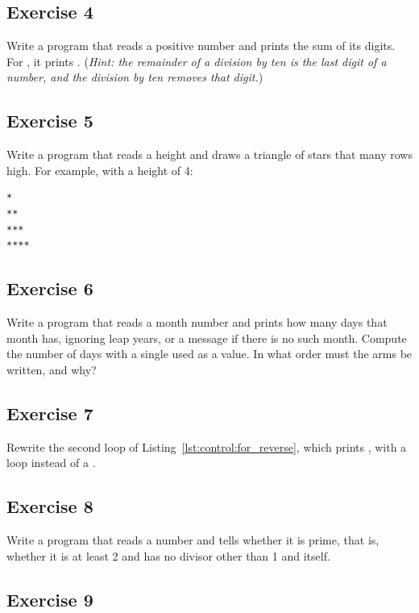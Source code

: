 \subsection*{Exercise 4}

Write a program that reads a positive number and prints the sum of its digits.
For , it prints . (\textit{Hint: the remainder of a
division by ten is the last digit of a number, and the division by ten removes
that digit.})

\subsection*{Exercise 5}

Write a program that reads a height and draws a triangle of stars that many rows
high. For example, with a height of 4:

\begin{lstlisting}[style=bashVerb]
*
**
***
****
\end{lstlisting}

\subsection*{Exercise 6}

Write a program that reads a month number and prints how many days that month
has, ignoring leap years, or a message if there is no such month. Compute the
number of days with a single  used as a value. In what order must
the arms be written, and why?

\subsection*{Exercise 7}

Rewrite the second loop of Listing~\ref{lst:control:for_reverse}, which prints
, with a  loop instead of a .

\subsection*{Exercise 8}

Write a program that reads a number and tells whether it is prime, that is,
whether it is at least 2 and has no divisor other than 1 and itself.

\subsection*{Exercise 9}

